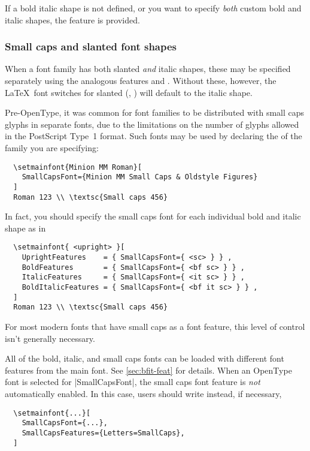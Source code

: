 If a bold italic shape is not defined, or you want to specify
\emph{both} custom bold and italic shapes, the 
feature is provided.



\subsubsection{Small caps and slanted font shapes}

When a font family has both slanted \emph{and} italic shapes, these may be specified separately using the analogous features  and .
Without these, however, the \LaTeX\ font switches for slanted (, ) will default to the italic shape.

Pre-OpenType, it was common for font families to be distributed with small caps glyphs in separate fonts, due to the limitations on the number of glyphs allowed in the PostScript Type~1 format.
Such fonts may be used by declaring the  of the family you are specifying:
\begin{Verbatim}
  \setmainfont{Minion MM Roman}[
    SmallCapsFont={Minion MM Small Caps & Oldstyle Figures}
  ]
  Roman 123 \\ \textsc{Small caps 456}
\end{Verbatim}
In fact, you should specify the small caps font for each individual bold and
italic shape as in
\begin{Verbatim}
  \setmainfont{ <upright> }[
    UprightFeatures    = { SmallCapsFont={ <sc> } } ,
    BoldFeatures       = { SmallCapsFont={ <bf sc> } } ,
    ItalicFeatures     = { SmallCapsFont={ <it sc> } } ,
    BoldItalicFeatures = { SmallCapsFont={ <bf it sc> } } ,
  ]
  Roman 123 \\ \textsc{Small caps 456}
\end{Verbatim}
For most modern fonts that have small caps as a font feature, this level of
control isn't generally necessary.

All of the bold, italic, and small caps fonts can be loaded with different
font features from the main font. See \ref{sec:bfit-feat} for details.
When an OpenType font is selected for |SmallCapsFont|, the small caps
font feature is \emph{not} automatically enabled. In this case, users
should write instead, if necessary,
\begin{Verbatim}
  \setmainfont{...}[
    SmallCapsFont={...},
    SmallCapsFeatures={Letters=SmallCaps},
  ]
\end{Verbatim}

